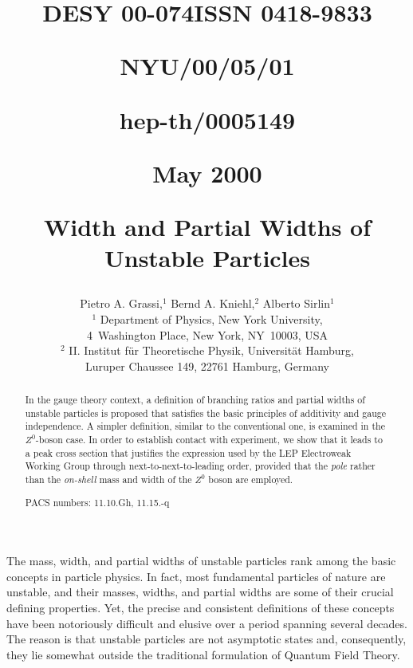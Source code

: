 \documentclass[a4paper,12pt]{article}
\begin{document}
\title{\vskip-3cm{\baselineskip12pt
\centerline{\normalsize DESY 00-074\hfill ISSN 0418-9833}
\centerline{\normalsize NYU/00/05/01\hfill}
\centerline{\normalsize hep-th/0005149\hfill}
\centerline{\normalsize May 2000\hfill}}
\vskip1.5cm 
Width and Partial Widths of Unstable Particles}
\author{{\sc Pietro A. Grassi,$^1$ Bernd A. Kniehl,$^2$ Alberto Sirlin$^1$}\\
{\normalsize $^1$ Department of Physics, New York University,}\\
{\normalsize 4~Washington Place, New York, NY~10003, USA}\\
{\normalsize $^2$ II. Institut f\"ur Theoretische Physik, Universit\"at
Hamburg,}\\
{\normalsize Luruper Chaussee 149, 22761 Hamburg, Germany}}

\date{}

\maketitle
\thispagestyle{empty}

\begin{abstract}
In the gauge theory context, a definition of branching ratios and partial
widths of unstable particles is proposed that satisfies the basic principles
of additivity and gauge independence.
A simpler definition, similar to the conventional one, is examined in the
$Z^0$-boson case. In order to establish contact with experiment, we show that 
it leads to a peak cross section that justifies the expression used by the
LEP Electroweak Working Group through next-to-next-to-leading order, provided
that the {\it pole} rather than the {\it on-shell} mass and width of the $Z^0$
boson are employed.

\medskip

\noindent
PACS numbers: 11.10.Gh, 11.15.-q
\end{abstract}

\newpage

The mass, width, and partial widths of unstable particles rank among the basic
concepts in particle physics.
In fact, most fundamental particles of nature are unstable, and their masses,
widths, and partial widths are some of their crucial defining properties. 
Yet, the precise and consistent definitions of these concepts have been
notoriously difficult and elusive over a period spanning several decades.
The reason is that unstable particles are not asymptotic states and,
consequently, they lie somewhat outside the traditional formulation of Quantum
Field Theory.
\end{document}
